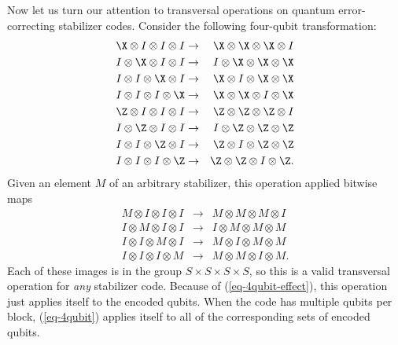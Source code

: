 Now let us turn our attention to transversal operations on quantum
error-correcting stabilizer codes.  Consider the following four-qubit
transformation:
\begin{eqnarray}
	\X \otimes I \otimes I \otimes I & \rightarrow & \X \otimes \X \otimes \X
	\otimes I \nonumber \\
	I \otimes \X \otimes I \otimes I & \rightarrow & I \otimes \X \otimes \X
	\otimes \X \nonumber \\
	I \otimes I \otimes \X \otimes I & \rightarrow & \X \otimes I \otimes \X
	\otimes \X \nonumber \\
	I \otimes I \otimes I \otimes \X & \rightarrow & \X \otimes \X \otimes I
	\otimes \X \label{eq-4qubit} \\
	\Z \otimes I \otimes I \otimes I & \rightarrow & \Z \otimes \Z \otimes \Z
	\otimes I \nonumber \\
	I \otimes \Z \otimes I \otimes I & \rightarrow & I \otimes \Z \otimes \Z
	\otimes \Z \nonumber \\
	I \otimes I \otimes \Z \otimes I & \rightarrow & \Z \otimes I \otimes \Z
	\otimes \Z \nonumber \\
	I \otimes I \otimes I \otimes \Z & \rightarrow & \Z \otimes \Z \otimes I
	\otimes \Z. \nonumber
\end{eqnarray}
Given an element $M$ of an arbitrary stabilizer, this operation applied
bitwise maps
\begin{eqnarray}
	M \otimes I \otimes I \otimes I & \rightarrow & M \otimes M \otimes M
	\otimes I \nonumber \\
	I \otimes M \otimes I \otimes I & \rightarrow & I \otimes M \otimes M
	\otimes M \label{eq-4qubit-effect} \\
	I \otimes I \otimes M \otimes I & \rightarrow & M \otimes I \otimes M
	\otimes M \nonumber \\
	I \otimes I \otimes I \otimes M & \rightarrow & M \otimes M \otimes I
	\otimes M. \nonumber
\end{eqnarray}
Each of these images is in the group $S \times S \times S \times S$, so this
is a valid transversal operation for {\em any} stabilizer code.  Because of
(\ref{eq-4qubit-effect}), this operation just applies itself to the encoded
qubits.  When the code has multiple qubits per block, (\ref{eq-4qubit})
applies itself to all of the corresponding sets of encoded qubits.

